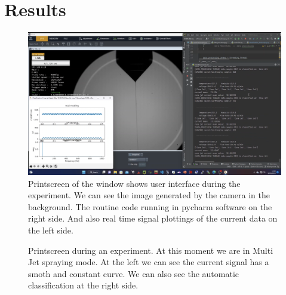\chapter{Results}
\label{chap:Results}


\begin{figure}[H]
    \center
    \includegraphics[width=17cm]{Figuras/19:03/axs1.png}
    \caption{Printscreen of the window shows user interface during the experiment.
        We can see the image generated by the camera in the background.
        The routine code running in pycharm software on the right side.
        And also real time signal plottings of the current data on the left side.}
\end{figure}


\begin{figure}[H]
    \centering
    \caption{Printscreen during an experiment. At this moment we are in Multi Jet spraying mode. At the left we can see the current signal has a smoth and constant curve. We can also see the automatic classification at the right side.}
    \label{fig:multi_class_exp}
\end{figure}


